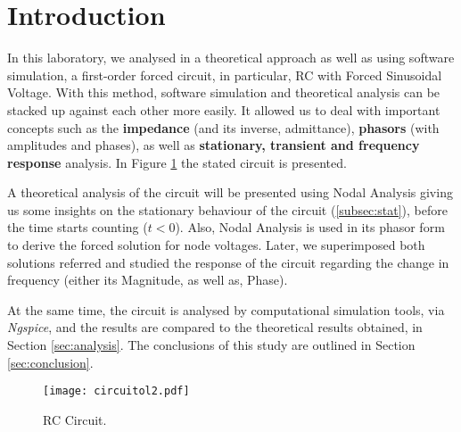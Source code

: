 \section{Introduction}
\label{sec:introduction}

In this laboratory, we analysed in a theoretical approach as well as using software simulation, a first-order forced circuit, in particular, RC with Forced Sinusoidal Voltage. With this method, software simulation and theoretical analysis can be stacked up against each other more easily. It allowed us to deal with important concepts such as the \textbf{impedance} (and its inverse, admittance), \textbf{phasors} (with amplitudes and phases), as well as \textbf{stationary, transient and frequency response} analysis. In Figure \ref{fig:circuitol2} the stated circuit is presented. 

A theoretical analysis of the circuit will be presented using Nodal Analysis giving us some insights on the stationary behaviour of the circuit (\ref{subsec:stat}), before the time starts counting ($t<0$). Also, Nodal Analysis is used in its phasor form to derive the forced solution for node voltages.  
Later, we superimposed both solutions referred and studied the response of the circuit regarding the change in frequency (either its Magnitude, as well as, Phase).


At the same time, the circuit is analysed by computational simulation tools, via \textit{Ngspice}, and the results are compared to the theoretical results obtained, in Section \ref{sec:analysis}. The conclusions of this study are outlined in Section \ref{sec:conclusion}.

\begin{figure}[h] \centering
\texttt{[image: circuitol2.pdf]}
\caption{RC Circuit.}
\label{fig:circuitol2}
\end{figure}

\clearpage
